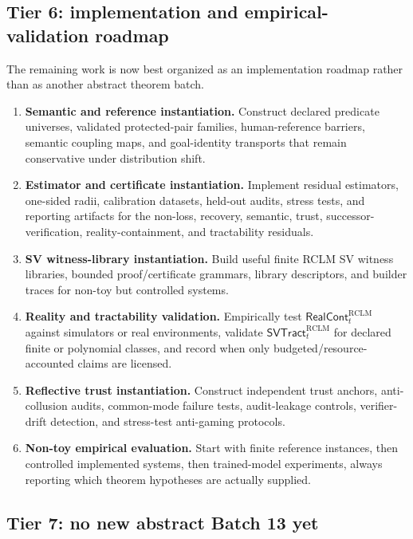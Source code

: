 \documentclass[11pt,a4paper]{article}
\newcommand{\RCLM}{\mathrm{RCLM}}
\begin{document}
\subsection{Tier 6: implementation and empirical-validation roadmap}

The remaining work is now best organized as an implementation roadmap rather than as another abstract theorem batch.
\begin{enumerate}[label=\textbf{\Alph*.},leftmargin=1.8em]
    \item \textbf{Semantic and reference instantiation.} Construct declared predicate universes, validated protected-pair families, human-reference barriers, semantic coupling maps, and goal-identity transports that remain conservative under distribution shift.
    \item \textbf{Estimator and certificate instantiation.} Implement residual estimators, one-sided radii, calibration datasets, held-out audits, stress tests, and reporting artifacts for the non-loss, recovery, semantic, trust, successor-verification, reality-containment, and tractability residuals.
    \item \textbf{SV witness-library instantiation.} Build useful finite RCLM SV witness libraries, bounded proof/certificate grammars, library descriptors, and builder traces for non-toy but controlled systems.
    \item \textbf{Reality and tractability validation.} Empirically test \(\mathsf{RealCont}_t^{\RCLM}\) against simulators or real environments, validate \(\mathsf{SVTract}_t^{\RCLM}\) for declared finite or polynomial classes, and record when only budgeted/resource-accounted claims are licensed.
    \item \textbf{Reflective trust instantiation.} Construct independent trust anchors, anti-collusion audits, common-mode failure tests, audit-leakage controls, verifier-drift detection, and stress-test anti-gaming protocols.
    \item \textbf{Non-toy empirical evaluation.} Start with finite reference instances, then controlled implemented systems, then trained-model experiments, always reporting which theorem hypotheses are actually supplied.
\end{enumerate}

\subsection{Tier 7: no new abstract Batch 13 yet}
\end{document}
